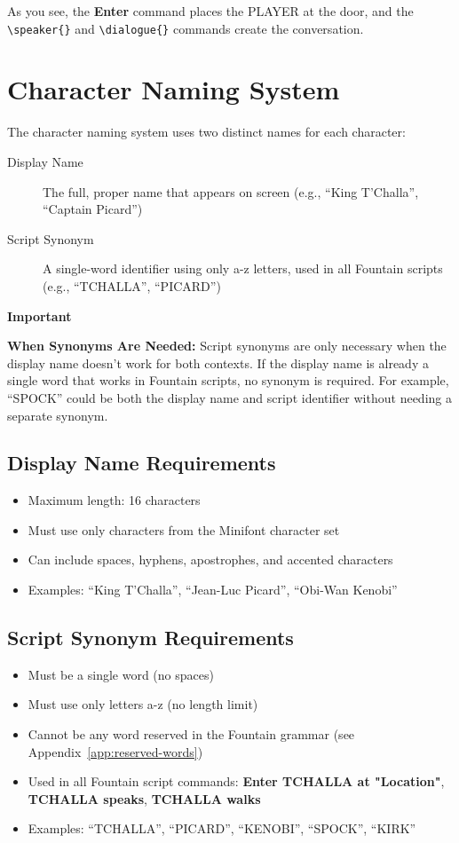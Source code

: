 \documentclass[11pt,letterpaper,oldstylefigures]{memoir}
\newenvironment{Important}
{\begingroup
\small
\setlength{\parindent}{0pt}
\setlength{\parskip}{0.5em}
\allowdisplaybreaks
\setlength{\displaywidowpenalty}{0}
\setlength{\widowpenalty}{0}
\setlength{\clubpenalty}{0}
\setlength{\interlinepenalty}{0}
\begin{tcolorbox}[
    colback=yellow!5,
    colframe=yellow!75!black,
    boxrule=0.5pt,
    arc=2pt,
    left=0.5em,
    right=0.5em,
    top=0.25em,
    bottom=0.25em
]
\textbf{Important}
\end{tcolorbox}\par
}
{\endgroup}
\newcommand{\paragraphbreak}{\vspace{0.5em}}
\newcommand{\fountain}[1]{\textbf{#1}}
\begin{document}
As you see, the \fountain{Enter} command places the PLAYER at the door, and the \texttt{\textbackslash speaker\{\}} and \texttt{\textbackslash dialogue\{\}} commands create the conversation.

\section{Character Naming System}
\paragraphbreak

The character naming system uses two distinct names for each character:

\begin{description}
\item[Display Name] The full, proper name that appears on screen (e.g., ``King T'Challa'', ``Captain Picard'')
\item[Script Synonym] A single-word identifier using only a-z letters, used in all Fountain scripts (e.g., ``TCHALLA'', ``PICARD'')
\end{description}

\begin{Important}
\textbf{When Synonyms Are Needed:} Script synonyms are only necessary when the display name doesn't work for both contexts. If the display name is already a single word that works in Fountain scripts, no synonym is required. For example, ``SPOCK'' could be both the display name and script identifier without needing a separate synonym.
\end{Important}

\subsection{Display Name Requirements}
\begin{itemize}
\item Maximum length: 16 characters
\item Must use only characters from the Minifont character set
\item Can include spaces, hyphens, apostrophes, and accented characters
\item Examples: ``King T'Challa'', ``Jean-Luc Picard'', ``Obi-Wan Kenobi''
\end{itemize}

\subsection{Script Synonym Requirements}
\begin{itemize}
\item Must be a single word (no spaces)
\item Must use only letters a-z (no length limit)
\item Cannot be any word reserved in the Fountain grammar (see Appendix~\ref{app:reserved-words})
\item Used in all Fountain script commands: \fountain{Enter TCHALLA at "Location"}, \fountain{TCHALLA speaks}, \fountain{TCHALLA walks}
\item Examples: ``TCHALLA'', ``PICARD'', ``KENOBI'', ``SPOCK'', ``KIRK''
\end{itemize}
\end{document}
